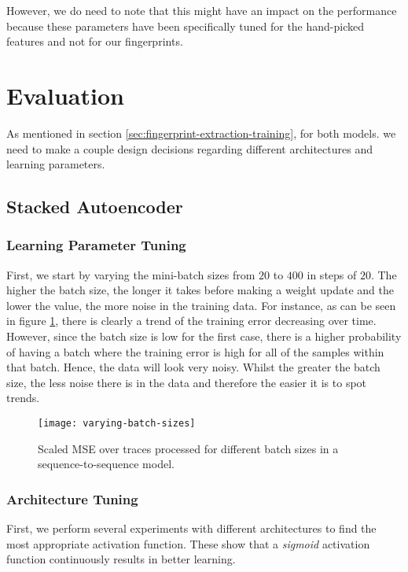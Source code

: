 However, we do need to note that this might have an impact on the performance because these parameters have been specifically tuned for the hand-picked features and not for our fingerprints.

\section{Evaluation}
As mentioned in section \ref{sec:fingerprint-extraction-training}, for both models. we need to make a couple design decisions regarding different architectures and learning parameters.

\subsection{Stacked Autoencoder}

\subsubsection{Learning Parameter Tuning}

First, we start by varying the mini-batch sizes from $20$ to $400$ in steps of $20$.
The higher the batch size, the longer it takes before making a weight update and the lower the value, the more noise in the training data.
For instance, as can be seen in figure \ref{fig:varying-batch-sizes}, there is clearly a trend of the training error decreasing over time.
However, since the batch size is low for the first case, there is a higher probability of having a batch where the training error is high for all of the samples within that batch.
Hence, the data will look very noisy.
Whilst the greater the batch size, the less noise there is in the data and therefore the easier it is to spot trends.

\begin{figure}[ht]
  \centering
  \texttt{[image: varying-batch-sizes]}
  \caption{Scaled MSE over traces processed for different batch sizes in a sequence-to-sequence model.}
  \label{fig:varying-batch-sizes}
\end{figure}


\subsubsection{Architecture Tuning}

First, we perform several experiments with different architectures to find the most appropriate activation function.
These show that a \textit{sigmoid} activation function continuously results in better learning.

